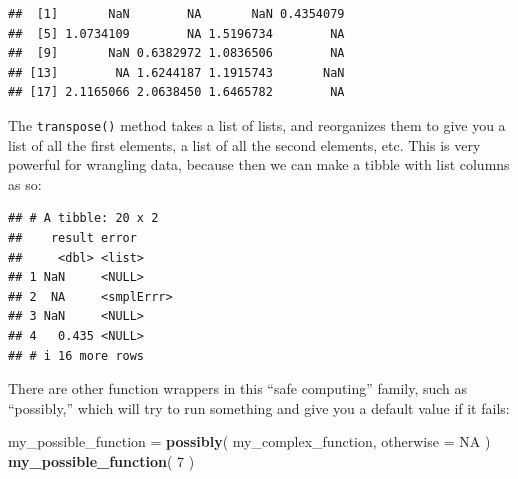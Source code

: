 \documentclass[
]{book}
\newenvironment{Shaded}{\begin{snugshade}}{\end{snugshade}}
\newcommand{\AttributeTok}[1]{\textcolor[rgb]{0.13,0.29,0.53}{#1}}
\newcommand{\ConstantTok}[1]{\textcolor[rgb]{0.56,0.35,0.01}{#1}}
\newcommand{\DecValTok}[1]{\textcolor[rgb]{0.00,0.00,0.81}{#1}}
\newcommand{\FunctionTok}[1]{\textcolor[rgb]{0.13,0.29,0.53}{\textbf{#1}}}
\newcommand{\NormalTok}[1]{#1}
\newcommand{\OtherTok}[1]{\textcolor[rgb]{0.56,0.35,0.01}{#1}}
\newcommand{\SpecialCharTok}[1]{\textcolor[rgb]{0.81,0.36,0.00}{\textbf{#1}}}
\begin{document}
\begin{Shaded}
\end{Shaded}

\begin{verbatim}
##  [1]       NaN        NA       NaN 0.4354079
##  [5] 1.0734109        NA 1.5196734        NA
##  [9]       NaN 0.6382972 1.0836506        NA
## [13]        NA 1.6244187 1.1915743       NaN
## [17] 2.1165066 2.0638450 1.6465782        NA
\end{verbatim}

The \texttt{transpose()} method takes a list of lists, and reorganizes them to give you a list of all the first elements, a list of all the second elements, etc.
This is very powerful for wrangling data, because then we can make a tibble with list columns as so:

\begin{Shaded}
\end{Shaded}

\begin{verbatim}
## # A tibble: 20 x 2
##    result error     
##     <dbl> <list>    
## 1 NaN     <NULL>    
## 2  NA     <smplErrr>
## 3 NaN     <NULL>    
## 4   0.435 <NULL>    
## # i 16 more rows
\end{verbatim}

There are other function wrappers in this ``safe computing'' family, such as ``possibly,'' which will try to run something and give you a default value if it fails:

\begin{Shaded}
\begin{Highlighting}[]
\NormalTok{my\_possible\_function }\OtherTok{=} \FunctionTok{possibly}\NormalTok{( my\_complex\_function, }
                                 \AttributeTok{otherwise =} \ConstantTok{NA}\NormalTok{ )}
\FunctionTok{my\_possible\_function}\NormalTok{( }\DecValTok{7}\NormalTok{ )}
\end{Highlighting}
\end{Shaded}
\end{document}
